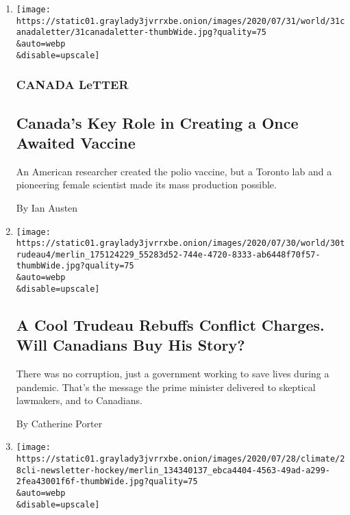 \begin{enumerate}
\def\labelenumi{\arabic{enumi}.}
\item
  \href{/2020/07/31/world/canada/leone-farrell-chemist.html}{}

  \texttt{[image: https://static01.graylady3jvrrxbe.onion/images/2020/07/31/world/31canadaletter/31canadaletter-thumbWide.jpg?quality=75\\\&auto=webp\\\&disable=upscale]}

  \hypertarget{canada-letter}{%
  \subsubsection{CANADA LeTTER}\label{canada-letter}}

  \hypertarget{canadas-key-role-in-creating-a-once-awaited-vaccine}{%
  \subsection{Canada's Key Role in Creating a Once Awaited
  Vaccine}\label{canadas-key-role-in-creating-a-once-awaited-vaccine}}

  An American researcher created the polio vaccine, but a Toronto lab
  and a pioneering female scientist made its mass production possible.

  By Ian Austen
\item
  \href{/2020/07/30/world/canada/justin-trudeau-we-charity.html}{}

  \texttt{[image: https://static01.graylady3jvrrxbe.onion/images/2020/07/30/world/30trudeau4/merlin\_175124229\_55283d52-744e-4720-8333-ab6448f70f57-thumbWide.jpg?quality=75\\\&auto=webp\\\&disable=upscale]}

  \hypertarget{a-cool-trudeau-rebuffs-conflict-charges-will-canadians-buy-his-story}{%
  \subsection{A Cool Trudeau Rebuffs Conflict Charges. Will Canadians
  Buy His
  Story?}\label{a-cool-trudeau-rebuffs-conflict-charges-will-canadians-buy-his-story}}

  There was no corruption, just a government working to save lives
  during a pandemic. That's the message the prime minister delivered to
  skeptical lawmakers, and to Canadians.

  By Catherine Porter
\item
  \href{/2020/07/29/climate/skating-hockey-climate-change.html}{}

  \texttt{[image: https://static01.graylady3jvrrxbe.onion/images/2020/07/28/climate/28cli-newsletter-hockey/merlin\_134340137\_ebca4404-4563-49ad-a299-2fea43001f6f-thumbWide.jpg?quality=75\\\&auto=webp\\\&disable=upscale]}


\end{enumerate}
